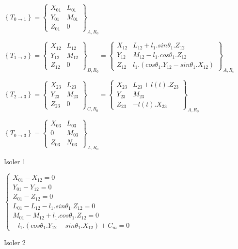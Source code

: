$\left\{T_{0\rightarrow 1}\right\}=\left\{\begin{array}{cc}
X_{01} & L_{01} \\
Y_{01} & M_{01} \\
Z_{01} & 0
\end{array}\right\}_{A,R_0}$

$\left\{T_{1\rightarrow 2}\right\}=\left\{\begin{array}{cc}
X_{12} & L_{12} \\
Y_{12} & M_{12} \\
Z_{12} & 0
\end{array}\right\}_{B,R_0}=\left\{\begin{array}{cc}
X_{12} & L_{12}+l_1.sin\theta_1.Z_{12} \\
Y_{12} & M_{12}-l_1.cos\theta_1.Z_{12} \\
Z_{12} & l_1.(cos\theta_1.Y_{12}-sin\theta_1.X_{12})
\end{array}\right\}_{A,R_0}$

$\left\{T_{2\rightarrow 3}\right\}=\left\{\begin{array}{cc}
X_{23} & L_{23} \\
Y_{23} & M_{23} \\
Z_{23} & 0
\end{array}\right\}_{C,R_0}=\left\{\begin{array}{cc}
X_{23} & L_{23}+l(t).Z_{23} \\
Y_{23} & M_{23} \\
Z_{23} & -l(t).X_{23}
\end{array}\right\}_{A,R_0}$

$\left\{T_{0\rightarrow 3}\right\}=\left\{\begin{array}{cc}
X_{03} & L_{03} \\
0 & M_{03} \\
Z_{03} & N_{03}
\end{array}\right\}_{A,R_0}$

Isoler 1

$\left\{\begin{array}{l}
X_{01}-X_{12}=0 \\
Y_{01}-Y_{12}=0 \\
Z_{01}-Z_{12}=0 \\
L_{01}-L_{12}-l_1.sin\theta_1.Z_{12}=0 \\
M_{01}-M_{12}+l_1.cos\theta_1.Z_{12}=0 \\
-l_1.(cos\theta_1.Y_{12}-sin\theta_1.X_{12})+C_m=0
\end{array}\right.$

Isoler 2

